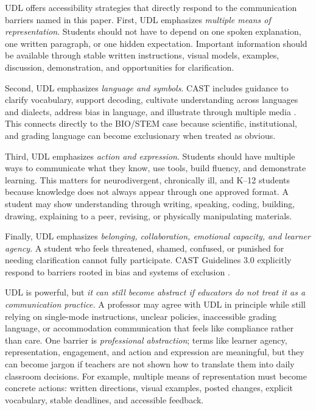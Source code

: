 \documentclass[11pt]{article}
\begin{document}

UDL offers accessibility strategies that directly respond to the communication barriers named in this paper. First, UDL emphasizes \textit{multiple means of representation}. Students should not have to depend on one spoken explanation, one written paragraph, or one hidden expectation. Important information should be available through stable written instructions, visual models, examples, discussion, demonstration, and opportunities for clarification.

Second, UDL emphasizes \textit{language and symbols}. CAST includes guidance to clarify vocabulary, support decoding, cultivate understanding across languages and dialects, address bias in language, and illustrate through multiple media \citep{cast2024udl}. This connects directly to the BIO/STEM case because scientific, institutional, and grading language can become exclusionary when treated as obvious.

Third, UDL emphasizes \textit{action and expression}. Students should have multiple ways to communicate what they know, use tools, build fluency, and demonstrate learning. This matters for neurodivergent, chronically ill, and K--12 students because knowledge does not always appear through one approved format. A student may show understanding through writing, speaking, coding, building, drawing, explaining to a peer, revising, or physically manipulating materials.

Finally, UDL emphasizes \textit{belonging, collaboration, emotional capacity, and learner agency}. A student who feels threatened, shamed, confused, or punished for needing clarification cannot fully participate. CAST Guidelines 3.0 explicitly respond to barriers rooted in bias and systems of exclusion \citep{cast2024udl}.


UDL is powerful, but \textit{it can still become abstract if educators do not treat it as a communication practice.} A professor may agree with UDL in principle while still relying on single-mode instructions, unclear policies, inaccessible grading language, or accommodation communication that feels like compliance rather than care. One barrier is \textit{professional abstraction}; terms like learner agency, representation, engagement, and action and expression are meaningful, but they can become jargon if teachers are not shown how to translate them into daily classroom decisions. For example, multiple means of representation must become concrete actions: written directions, visual examples, posted changes, explicit vocabulary, stable deadlines, and accessible feedback.
\end{document}
